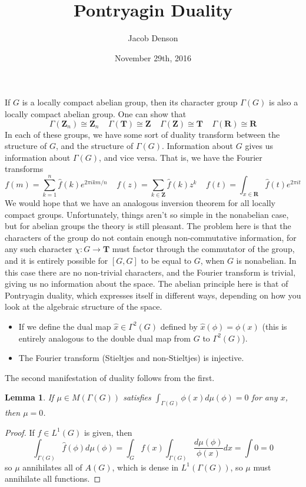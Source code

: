 \documentclass{article}
\title{Pontryagin Duality}
\author{Jacob Denson}
\date{November 29th, 2016}
\theoremstyle{plain}
\newtheorem{lemma}[theorem]{Lemma}
\theoremstyle{definition}
\begin{document}
\maketitle

If $G$ is a locally compact abelian group, then its character group $\Gamma(G)$ is also a locally compact abelian group. One can show that
%
\[ \Gamma(\mathbf{Z}_n) \cong \mathbf{Z}_n\ \ \ \ \ \Gamma(\mathbf{T}) \cong \mathbf{Z}\ \ \ \ \ \Gamma(\mathbf{Z}) \cong \mathbf{T}\ \ \ \ \ \Gamma(\mathbf{R}) \cong \mathbf{R} \]
%
In each of these groups, we have some sort of duality transform between the structure of $G$, and the structure of $\Gamma(G)$. Information about $G$ gives us information about $\Gamma(G)$, and vice versa.  That is, we have the Fourier transforms
%
\[ f(m) = \sum_{k = 1}^n \widehat{f}(k) e^{2 \pi i k m/n}\ \ \ \ \ f(z) = \sum_{k \in \mathbf{Z}} \widehat{f}(k) z^k\ \ \ \ \ f(t) = \int_{x \in \mathbf{R}} \widehat{f}(t) e^{2 \pi i t} \]
%
We would hope that we have an analogous inversion theorem for all locally compact groups. Unfortunately, things aren't so simple in the nonabelian case, but for abelian groups the theory is still pleasant. The problem here is that the characters of the group do not contain enough non-commutative information, for any such character $\chi: G \to \mathbf{T}$ must factor through the commutator of the group, and it is entirely possible for $[G,G]$ to be equal to $G$, when $G$ is nonabelian. In this case there are no non-trivial characters, and the Fourier transform is trivial, giving us no information about the space. The abelian principle here is that of Pontryagin duality, which expresses itself in different ways, depending on how you look at the algebraic structure of the space.
%
\begin{itemize}
    \item If we define the dual map $\widehat{x} \in \Gamma^2(G)$ defined by $\widehat{x}(\phi) = \phi(x)$ (this is entirely analogous to the double dual map from $G$ to $\Gamma^2(G)$).
    \item The Fourier transform (Stieltjes and non-Stieltjes) is injective.
\end{itemize}

The second manifestation of duality follows from the first.

\begin{lemma}
    If $\mu \in M(\Gamma(G))$ satisfies $\int_{\Gamma(G)} \phi(x) d\mu(\phi) = 0$ for any $x$, then $\mu = 0$.
\end{lemma}
\begin{proof}
    If $f \in L^1(G)$ is given, then
    \[ \int_{\Gamma(G)} \widehat{f}(\phi) d\mu(\phi) = \int_G f(x) \int_{\Gamma(G)} \frac{d\mu(\phi)}{\phi(x)} dx = \int 0 = 0 \]
    so $\mu$ annihilates all of $A(G)$, which is dense in $L^1(\Gamma(G))$, so $\mu$ must annihilate all functions.
\end{proof}
\end{document}

